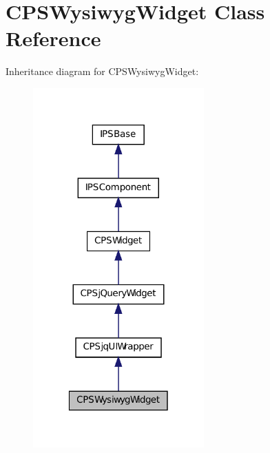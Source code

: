 \hypertarget{classCPSWysiwygWidget}{
\section{CPSWysiwygWidget Class Reference}
\label{classCPSWysiwygWidget}
}


Inheritance diagram for CPSWysiwygWidget:\nopagebreak
\begin{figure}[H]
\begin{center}
\leavevmode
\includegraphics[width=186pt]{classCPSWysiwygWidget__inherit__graph}
\end{center}
\end{figure}


